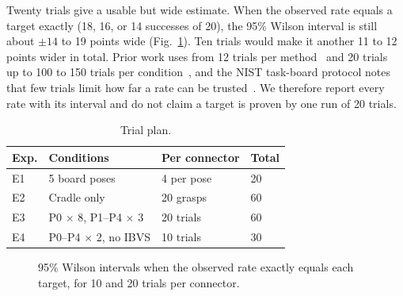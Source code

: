 \documentclass[11pt,conference]{IEEEtran}
\begin{document}
Twenty trials give a usable but wide estimate. When the observed rate equals a target exactly (18, 16, or 14 successes of 20), the 95\% Wilson interval is still about $\pm14$ to 19 points wide (Fig.~\ref{fig:ci}). Ten trials would make it another 11 to 12 points wider in total. Prior work uses from 12 trials per method~\cite{peng2020comparison} and 20 trials~\cite{she2021cable} up to 100 to 150 trials per condition~\cite{haugaard2020,lian2021}, and the NIST task-board protocol notes that few trials limit how far a rate can be trusted~\cite{kimble2020}. We therefore report every rate with its interval and do not claim a target is proven by one run of 20 trials.

\begin{table}[H]
\caption{Trial plan.}
\label{tab:trials}
\centering
\small
\renewcommand{\arraystretch}{1.12}
\begin{tabular}{@{}p{.8cm}p{2.9cm}p{2.3cm}p{1.2cm}@{}}
\toprule
\textbf{Exp.} & \textbf{Conditions} & \textbf{Per connector} & \textbf{Total}\\
\midrule
E1 & 5 board poses & 4 per pose & 20\\
E2 & Cradle only & 20 grasps & 60\\
E3 & P0 $\times$ 8, P1--P4 $\times$ 3 & 20 trials & 60\\
E4 & P0--P4 $\times$ 2, no IBVS & 10 trials & 30\\
\bottomrule
\end{tabular}
\end{table}

\begin{figure}[H]
\centering
{}
\caption{95\% Wilson intervals when the observed rate exactly equals each target, for 10 and 20 trials per connector.}
\label{fig:ci}
\end{figure}
\end{document}

